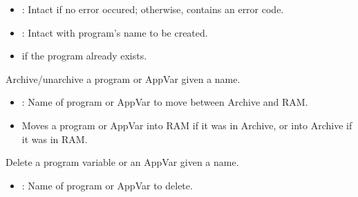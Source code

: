 \documentclass[letterpaper,10pt,english]{sphinxmanual}
\begin{document}
\begin{description}
\begin{description}
\begin{itemize}
\end{itemize}

\begin{itemize}
\item {} 
\sphinxAtStartPar
{}: Intact if no error occured; otherwise, contains an error code.

\item {} 
\sphinxAtStartPar
{}: Intact with program’s name to be created.

\end{itemize}

\begin{itemize}
\item {} 
\sphinxAtStartPar
{} if the program already exists.

\end{itemize}

\end{description}

\sphinxAtStartPar
Archive/unarchive a program or AppVar given a name.
\begin{description}
\begin{itemize}
\item {} 
\sphinxAtStartPar
{}: Name of program or AppVar to move between Archive and RAM.

\end{itemize}

\begin{itemize}
\item {} 
\sphinxAtStartPar
Moves a program or AppVar into RAM if it was in Archive, or into Archive if it was in RAM.

\end{itemize}

\end{description}

\sphinxAtStartPar
Delete a program variable or an AppVar given a name.
\begin{description}
\begin{itemize}
\item {} 
\sphinxAtStartPar
{}: Name of program or AppVar to delete.


\end{itemize}
\end{description}
\end{description}
\end{document}
